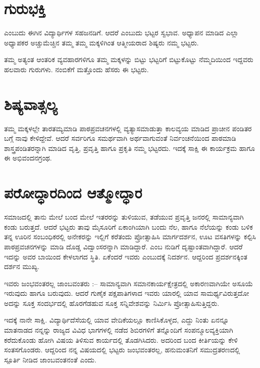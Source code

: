 {\section*{ಗುರುಭಕ್ತಿ}  

   ಎಂಬುದು ಈಗಿನ ವಿದ್ಯಾರ್ಥಿಗಳ ಸಹಜನಡಿಗೆ.  ಆದರೆ   ಎಂಬುದು ಭಟ್ಟರ ಸ್ವಭಾವ.  ಅಧ್ಯಾಪನ ಮಾಡಿದ ಎಲ್ಲಾ ಅಧ್ಯಾಪಕರ ಅಚ್ಚುಮೆಚ್ಚಿನ ತಮ್ಮ ತಮ್ಮ ಮಕ್ಕಳಿಗಿಂತ ಆತ್ಮೀಯರಾದ ಶಿಷ್ಯರು ನಮ್ಮ ಭಟ್ಟರು.

ತಮ್ಮ ಅತ್ಯಂತ ಆಂತರಿಕ ವ್ಯವಹಾರಗಳಿಗೂ ತಮ್ಮ ಮಕ್ಕಳನ್ನು ಬಿಟ್ಟು ಭಟ್ಟರಿಗೆ ಬಿಟ್ಟುಕೊಟ್ಟು ನೆಮ್ಮದಿಯಿಂದ ಇದ್ದವರು ಹಲವಾರು ಗುರುಗಳು. ನಂಬಿಕೆಗೆ ಮತ್ತೊಂದು ಹೆಸರು ಈ ಭಟ್ಟರು.

\section*{ಶಿಷ್ಯವಾತ್ಸಲ್ಯ} 

ತಮ್ಮ ಮಕ್ಕಳಲ್ಲೇ ತಾರತಮ್ಯಮಾಡಿ ಪಾಠಪ್ರವಚನಗಳಲ್ಲಿ ವ್ಯತ್ಯಾಸಮಾಡುತ್ತಾ ಕಾಲವ್ಯಯ ಮಾಡಿದ ಪ್ರಾಚೀನ ಪಂಡಿತರ ಬಗ್ಗೆ ನಾವು ಕೇಳಿದ್ದೇವೆ.  ಆದರೆ ಸರ್ವರಿಗೂ ಸಮರ್ಥವಾಗಿ ಅರ್ಥವಾಗುವಂತೆ ನಿರ್ವಂಚನೆಯಿಂದ ಪಾಠಮಾಡಿ ಶಾಸ್ತ್ರಪಂಡಿತರನ್ನಾಗಿ ಮಾಡಿದ ವೃತ್ತಿ, ಪ್ರವೃತ್ತಿ ಹಾಗೂ ಪ್ರಕೃತಿ ನಮ್ಮ ಭಟ್ಟರದು.  ಇದಕ್ಕೆ ಸಾಕ್ಷಿ ಈ ಕಾರ್ಯಕ್ರಮ ಹಾಗೂ ಈ ಅಭಿವಂದನಗ್ರಂಥ.

\section*{ಪರೋದ್ಧಾರದಿಂದ ಆತ್ಮೋದ್ಧಾರ} 

ಸಮಾಜದಲ್ಲಿ ತಾನು ಮೇಲೆ ಬಂದ ಮೇಲೆ ಇತರರನ್ನು ತುಳಿಯುವ, ತಡೆಯುವ ಪ್ರವೃತ್ತಿ ಜನರಲ್ಲಿ ಸಾಮಾನ್ಯವಾಗಿ ಕಂಡು ಬರುತ್ತದೆ.  ಆದರೆ ಭಟ್ಟರು ತಾವು ಮೈಸೂರಿಗೆ ಏಕಾಂಗಿಯಾಗಿ ಬಂದು ನೆಲ, ಹಾಗೂ ನೆಲೆಯನ್ನು ಕಂಡು ಬಳಿಕ ತನ್ನ ಊರಿನ  ಸಂಬಂಧಿಕರಲ್ಲಿ ಅನೇಕರನ್ನು ಇಲ್ಲಿಗೆ ಕರೆತಂದು ಪ್ರೋತ್ಸಾಹಿಸಿ ಮಾರ್ಗದರ್ಶನ, ಊಟ ವಸತಿಗಳನ್ನು ಕಲ್ಪಿಸಿ ಪಾಠಪ್ರವಚನಗಳನ್ನು ಮಾಡಿ ದೊಡ್ಡ ವಿದ್ವಾಂಸರನ್ನಾಗಿ ಮಾಡಿದ್ದಾರೆ.  ಎಂಬ ನುಡಿಗೆ ದೃಷ್ಟಾಂತವಾಗಿದ್ದಾರೆ.  ಆದರೆ ಇದನ್ನು ಅವರ ಬಾಯಿಂದ ಕೇಳಲಾಗದ ಸ್ಥಿತಿ.  ಏಕೆಂದರೆ ಇವರು   ಎಂಬುದಕ್ಕೆ ನಿದರ್ಶನ. ಆದ್ದರಿಂದ ಪ್ರದರ್ಶನಕ್ಕಿಂತ ದರ್ಶನ ಮುಖ್ಯ. 

ಇವರು ಜಂಭವಂತರಲ್ಲ ಜಾಂಬವಂತರು :–  ಸಾಮಾನ್ಯವಾಗಿ ಸಮಾನಕಾರ್ಯಕ್ಷೇತ್ರದಲ್ಲಿ ಅಕಾರಣವಾಗಿಯೇ ಅಸೂಯೆ ಇರುವುದು ಹಾಗೂ ಬರುವುದು.  ಆದರೆ ಗುಣೈಕ ಪಕ್ಷಪಾತಿಗಳಾದ ಇವರು ಯಾರಲ್ಲಿ ಯಾವ ಸಾಮರ್ಥ್ಯವಿರುತ್ತದೋ ಅದನ್ನು ಸೂಕ್ತ ಸಂದರ್ಭದಲ್ಲಿ ಹೊರಗೆಡಹುವ  ಸೂಕ್ತ ಸನ್ನಿವೇಶವನ್ನು ನಿರ್ಮಿಸಿ ಪ್ರೋತ್ಸಾಹಿಸುತ್ತಿದ್ದರು. 

ಇದಕ್ಕೆ ನಾನೇ ಸಾಕ್ಷಿ.  ವಿದ್ಯಾರ್ಥಿದೆಸೆಯಲ್ಲಿ ಯಾವ ವೇದಿಕೆಯಲ್ಲೂ ಕಾಣಿಸಿಕೊಳ್ಳದ, ಎದ್ದು ನಿಂತು ಏನನ್ನೂ ಮಾತನಾಡದ ನನ್ನನ್ನು ರಾಜ್ಯದ ವಿವಿಧ ಭಾಗಗಳಲ್ಲಿ ನಡೆದ ಶಿಬಿರಗಳಿಗೆ ತನ್ನೊಂದಿಗೆ ಸಂಪನ್ಮೂಲವ್ಯಕ್ತಿಯಾಗಿ ಕರೆದುಕೊಂಡು ಹೋಗಿ ವಿಷಯ ತಿಳಿಸುವ ಕಾರ್ಯದಲ್ಲಿ ತೊಡಗಿಸಿದರು.  ಅದರಿಂದ ಬಂದ ಕೀರ್ತಿಯನ್ನು ಕೇಳಿ ಸಂತಸಗೊಂಡರು.  ಆದ್ದರಿಂದ ನನ್ನ ವಿಷಯದಲ್ಲಿ ಭಟ್ಟರು ಜಂಭವಂತರಲ್ಲ,  ಹನುಮಂತನಿಗೆ  ಸಮುದ್ರತರಣದಲ್ಲಿ  ಸ್ಪೂರ್ತಿ ನೀಡಿದ  ಜಾಂಬವಂತನಂತೆ ಎಂದು.

}
